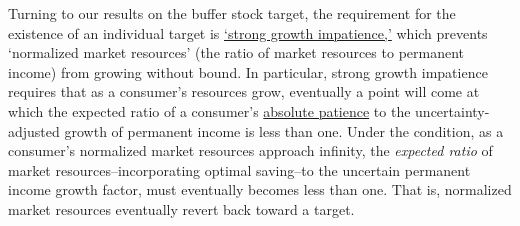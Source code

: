 \documentclass[BufferStockTheory]{subfiles}
\begin{document}





% 

Turning to our results on the buffer stock target, the requirement for the existence of an individual target is \hyperlink{GIC-Mod}{`strong growth impatience,'} which prevents `normalized market resources' (the ratio of market resources to permanent income) from growing without bound. In particular, strong growth impatience requires that as a consumer's resources grow, eventually a point will come at which the expected ratio of a consumer's \hyperlink{APFacDefn}{absolute patience} to the uncertainty-adjusted growth of permanent income is less than one. Under the condition, as a consumer's normalized market resources approach infinity, the \textit{expected ratio} of market resources--incorporating optimal saving--to the uncertain permanent income growth factor, must eventually becomes less than one. That is, normalized market resources eventually revert back toward a target.
\end{document}
